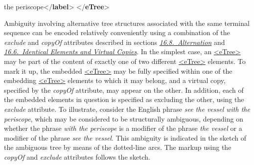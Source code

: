 \begin{shaded}
\hspace*{1em}\hspace*{1em}the periscope{</\textbf{label}>}\mbox{}\newline 
\hspace*{1em}\mbox{}\newline 
{}\mbox{}\newline 
{</\textbf{eTree}>}\end{shaded}\egroup\par \par
Ambiguity involving alternative tree structures associated with the same terminal sequence can be encoded relatively conveniently using a combination of the {\itshape exclude} and {\itshape copyOf} attributes described in sections \textit{\hyperref[SAAT]{16.8.\ Alternation}} and \textit{\hyperref[SAIE]{16.6.\ Identical Elements and Virtual Copies}}. In the simplest case, an \hyperref[TEI.eTree]{<eTree>} may be part of the content of exactly one of two different \hyperref[TEI.eTree]{<eTree>} elements. To mark it up, the embedded \hyperref[TEI.eTree]{<eTree>} may be fully specified within one of the embedding \hyperref[TEI.eTree]{<eTree>} elements to which it may belong, and a virtual copy, specified by the {\itshape copyOf} attribute, may appear on the other. In addition, each of the embedded elements in question is specified as excluding the other, using the {\itshape exclude} attribute. To illustrate, consider the English phrase \textit{see the vessel with the periscope}, which may be considered to be structurally ambiguous, depending on whether the phrase \textit{with the periscope} is a modifier of the phrase \textit{the vessel} or a modifier of the phrase \textit{see the vessel}. This ambiguity is indicated in the sketch of the ambiguous tree by means of the dotted-line arcs. The markup using the {\itshape copyOf} and {\itshape exclude} attributes follows the sketch.\par
